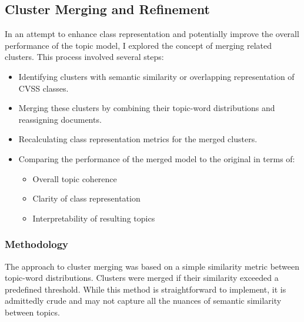 \documentclass[12pt]{article}
\begin{document}

\subsection{Cluster Merging and Refinement}

In an attempt to enhance class representation and potentially improve the overall performance of the
topic model, I explored the concept of merging related clusters. This process involved several steps:

\begin{itemize}

	\item Identifying clusters with semantic similarity or overlapping representation of CVSS classes.

	\item Merging these clusters by combining their topic-word distributions and reassigning documents.

	\item Recalculating class representation metrics for the merged clusters.

	\item Comparing the performance of the merged model to the original in terms of:

	      \begin{itemize}

		      \item Overall topic coherence

		      \item Clarity of class representation

		      \item Interpretability of resulting topics

	      \end{itemize}

\end{itemize}

\subsubsection{Methodology}

The approach to cluster merging was based on a simple similarity metric between topic-word
distributions. Clusters were merged if their similarity exceeded a predefined threshold. While this
method is straightforward to implement, it is admittedly crude and may not capture all the nuances
of semantic similarity between topics.
\end{document}
